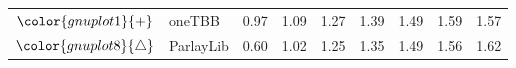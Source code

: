 \begin{tabular}{clrrrrrrr}
\rowcolor{gnuplot1!10}$\color{gnuplot1}{+}$ & oneTBB & \cellcolor{gnuplot1!10} 0.97 & \cellcolor{gnuplot1!10} 1.09 & \cellcolor{gnuplot1!10} 1.27 & \cellcolor{gnuplot1!10} 1.39 & \cellcolor{gnuplot1!10} 1.49 & \cellcolor{gnuplot1!10} 1.59 & \cellcolor{gnuplot1!10} 1.57 \\
\rowcolor{gnuplot8!10}$\color{gnuplot8}{\triangle}$ & ParlayLib & \cellcolor{gnuplot8!10} 0.60 & \cellcolor{gnuplot8!10} 1.02 & \cellcolor{gnuplot8!10} 1.25 & \cellcolor{gnuplot8!10} 1.35 & \cellcolor{gnuplot8!10} 1.49 & \cellcolor{gnuplot8!10} 1.56 & \cellcolor{gnuplot8!10} 1.62 \\
\bottomrule
\end{tabular}
